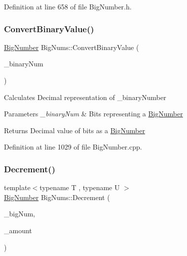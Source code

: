 Definition at line 658 of file Big\+Number.\+h.

\mbox{\label{namespace_big_nums_ad3c1a55de2f548036c5f3888c2b4061d}} 
\subsubsection{\texorpdfstring{ConvertBinaryValue()}{ConvertBinaryValue()}}
{\footnotesize\ttfamily \mbox{\hyperlink{class_big_nums_1_1_big_number}{Big\+Number}} Big\+Nums\+::\+Convert\+Binary\+Value (\begin{DoxyParamCaption}\item[{const \mbox{\hyperlink{class_big_nums_1_1_big_number}{Big\+Number}} \&}]{\+\_\+binary\+Num }\end{DoxyParamCaption})}

Calculates Decimal representation of \+\_\+binary\+Number 
\begin{DoxyParams}{Parameters}
{\em \+\_\+binary\+Num} & Bits representing a \mbox{\hyperlink{class_big_nums_1_1_big_number}{Big\+Number}} \\
\hline
\end{DoxyParams}
\begin{DoxyReturn}{Returns}
Decimal value of bits as a \mbox{\hyperlink{class_big_nums_1_1_big_number}{Big\+Number}} 
\end{DoxyReturn}


Definition at line 1029 of file Big\+Number.\+cpp.

\mbox{\label{namespace_big_nums_a5ade9d910a990dfe7a21a3015d2a523a}} 
\subsubsection{\texorpdfstring{Decrement()}{Decrement()}}
{\footnotesize\ttfamily template$<$typename T , typename U $>$ \\
\mbox{\hyperlink{class_big_nums_1_1_big_number}{Big\+Number}} Big\+Nums\+::\+Decrement (\begin{DoxyParamCaption}\item[{T \&}]{\+\_\+big\+Num,  }\item[{const U \&}]{\+\_\+amount }\end{DoxyParamCaption})}

